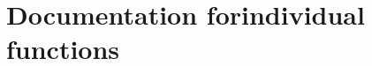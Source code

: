 \chapter[Documentation for individual functions]{Documentation for\newline individual functions}\label{chap:individual-functions}

